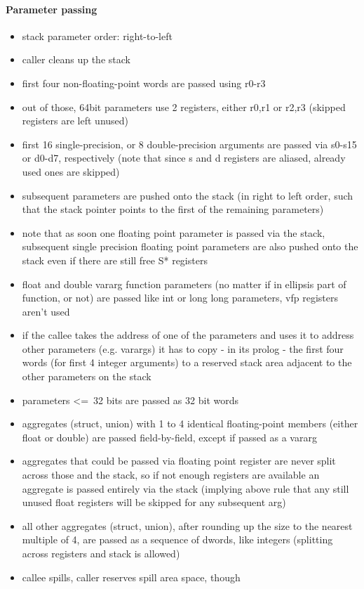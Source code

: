 \paragraph{Parameter passing}

\begin{itemize}
\item stack parameter order: right-to-left
\item caller cleans up the stack
\item first four non-floating-point words are passed using r0-r3
\item out of those, 64bit parameters use 2 registers, either r0,r1 or r2,r3 (skipped registers are left unused)
\item first 16 single-precision, or 8 double-precision arguments are passed via s0-s15 or d0-d7, respectively (note that since s and d registers are aliased, already used ones are skipped)
\item subsequent parameters are pushed onto the stack (in right to left order, such that the stack pointer points to the first of the remaining parameters)
\item note that as soon one floating point parameter is passed via the stack, subsequent single precision floating point parameters are also pushed onto the stack even if there are still free S* registers
\item float and double vararg function parameters (no matter if in ellipsis part of function, or not) are passed like int or long long parameters, vfp registers aren't used
\item if the callee takes the address of one of the parameters and uses it to address other parameters (e.g. varargs) it has to copy - in its prolog - the first four words (for first 4 integer arguments) to a reserved stack area adjacent to the other parameters on the stack
\item parameters \textless=\ 32 bits are passed as 32 bit words
\item aggregates (struct, union) with 1 to 4 identical floating-point members (either float or double) are passed field-by-field, except if passed as a vararg
\item aggregates that could be passed via floating point register are never split across those and the stack, so if not enough registers are available an aggregate is
passed entirely via the stack (implying above rule that any still unused float registers will be skipped for any subsequent arg)
\item all other aggregates (struct, union), after rounding up the size to the nearest multiple of 4, are passed as a sequence of dwords, like integers (splitting across registers and stack is allowed)
\item callee spills, caller reserves spill area space, though
\end{itemize}

